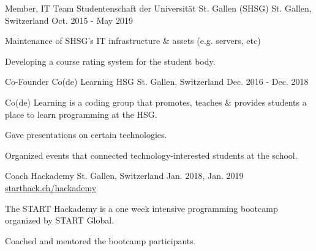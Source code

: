

\begin{cventries}

  \cventry
    {Member, IT Team} %
    {Studentenschaft der Universität St. Gallen (SHSG)} %
    {St. Gallen, Switzerland} %
    {Oct. 2015 - May 2019} %
    {} %
    {
      \begin{cvitems} %
        \item {Maintenance of SHSG's IT infrastructure \& assets (e.g. servers, etc)}
        \item {Developing a course rating system for the student body.}
      \end{cvitems}
    }
  \cventry
    {Co-Founder} %
    {Co(de) Learning HSG} %
    {St. Gallen, Switzerland} %
    {Dec. 2016 - Dec. 2018} %
    {} %
    {
      \begin{cvitems} %
        \item {Co(de) Learning is a coding group that promotes, teaches \& provides students a place to learn programming at the HSG.}
        \item {Gave presentations on certain technologies.}
        \item {Organized events that connected technology-interested students at the school.}
      \end{cvitems}
    }

    \cventry
      {Coach} %
      {Hackademy} %
      {St. Gallen, Switzerland} %
      {Jan. 2018, Jan. 2019} %
      {\href{https://starthack.ch/hackademy/}{starthack.ch/hackademy}} %
      {
        \begin{cvitems} %
          \item {The START Hackademy is a one week intensive programming bootcamp organized by START Global.}
          \item {Coached and mentored the bootcamp participants.}
        \end{cvitems}
      }




\end{cventries}
